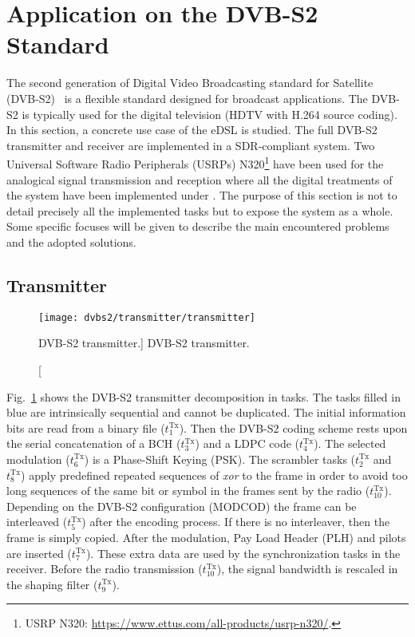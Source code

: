 \section{Application on the DVB-S2 Standard}

The second generation of Digital Video Broadcasting standard for Satellite
(DVB-S2)~\cite{ETSI2005} is a flexible standard designed for broadcast
applications. The DVB-S2 is typically used for the digital television (HDTV
with H.264 source coding). In this section, a concrete use case of the \AFFECT
eDSL is studied. The full DVB-S2 transmitter and receiver are implemented in a
SDR-compliant system. Two Universal Software Radio Peripherals (USRPs)
N320\footnote{USRP N320: \url{https://www.ettus.com/all-products/usrp-n320/}.}
have been used for the analogical signal transmission and reception where all
the digital treatments of the system have been implemented under \AFFECT. The
purpose of this section is not to detail precisely all the implemented tasks
but to expose the system as a whole. Some specific focuses will be given to
describe the main encountered problems and the adopted solutions.

\subsection{Transmitter}

\begin{figure}[htp]
  \centering
  \texttt{[image: dvbs2/transmitter/transmitter]}
  \caption
    [DVB-S2 transmitter.]
    {DVB-S2 transmitter.}
  \label{fig:dvbs2_transmitter}
\end{figure}

Fig.~\ref{fig:dvbs2_transmitter} shows the DVB-S2 transmitter decomposition in
tasks. The tasks filled in blue are intrinsically sequential and cannot be
duplicated. The initial information bits are read from a binary file
($t^\text{Tx}_1$). Then the DVB-S2 coding scheme rests upon the serial
concatenation of a BCH ($t^\text{Tx}_3$) and a LDPC code ($t^\text{Tx}_4$). The
selected modulation ($t^\text{Tx}_6$) is a Phase-Shift Keying (PSK). The
scrambler tasks ($t^\text{Tx}_2$ and $t^\text{Tx}_8$) apply predefined repeated
sequences of \emph{xor} to the frame in order to avoid too long sequences of the
same bit or symbol in the frames sent by the radio ($t^\text{Tx}_{10}$).
Depending on the DVB-S2 configuration (MODCOD) the frame can be interleaved
($t^\text{Tx}_5$) after the encoding process. If there is no interleaver, then
the frame is simply copied. After the modulation, Pay Load Header (PLH) and
pilots are inserted ($t^\text{Tx}_7$). These extra data are used by the
synchronization tasks in the receiver. Before the radio transmission
($t^\text{Tx}_{10}$), the signal bandwidth is rescaled in the shaping filter
($t^\text{Tx}_9$).

